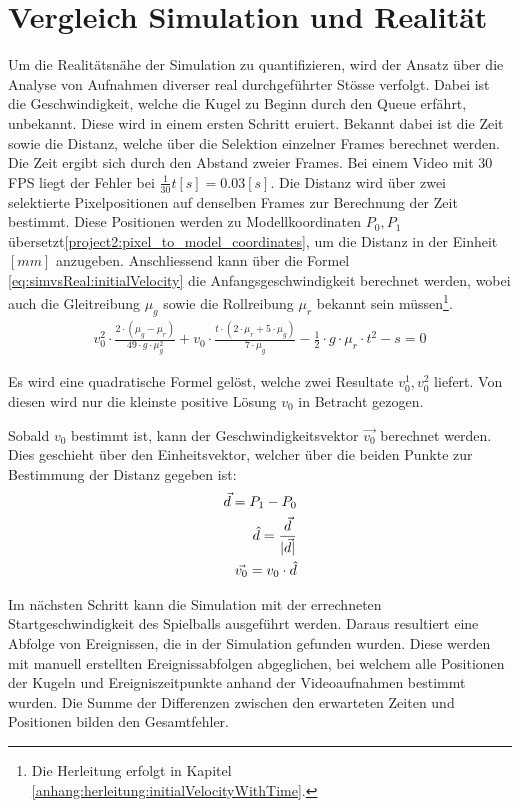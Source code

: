 \section{Vergleich Simulation und Realität}
Um die Realitätsnähe der Simulation zu quantifizieren, wird der Ansatz über die Analyse von Aufnahmen diverser real
durchgeführter Stösse verfolgt. Dabei ist die Geschwindigkeit, welche die Kugel zu Beginn durch den Queue erfährt,
unbekannt. Diese wird in einem ersten Schritt eruiert. Bekannt dabei ist die Zeit sowie die Distanz, welche über die
Selektion einzelner Frames berechnet werden. Die Zeit ergibt sich durch den Abstand zweier Frames. Bei einem Video mit
30 FPS liegt der Fehler bei $\frac{1}{30} t [s] = 0.03 [s]$. Die Distanz wird über zwei selektierte Pixelpositionen
auf denselben Frames zur Berechnung der Zeit bestimmt. Diese Positionen werden zu Modellkoordinaten $P_0, P_1$
übersetzt\ref{project2:pixel_to_model_coordinates}, um die
Distanz in der Einheit $[mm]$ anzugeben. Anschliessend kann über die Formel \ref{eq:simvsReal:initialVelocity} die Anfangsgeschwindigkeit berechnet
werden, wobei auch die Gleitreibung $\mu_g$ sowie die Rollreibung $\mu_r$ bekannt sein müssen\footnote{Die Herleitung
erfolgt in Kapitel \ref{anhang:herleitung:initialVelocityWithTime}.}.
\begin{align}
    v_0^2 \cdot \frac{2 \cdot (\mu_g - \mu_r)}{49 \cdot g \cdot \mu_g^2} + v_0 \cdot \frac{t \cdot (2 \cdot \mu_r + 5 \cdot \mu_g)}{7 \cdot \mu_g} - \frac{1}{2} \cdot g \cdot \mu_r \cdot t^2 - s = 0\label{eq:simvsReal:initialVelocity}
\end{align}

Es wird eine quadratische Formel gelöst, welche zwei Resultate $v^1_0, v^2_0$ liefert. Von diesen wird nur die
kleinste positive Lösung $v_0$ in Betracht gezogen.

Sobald $v_0$ bestimmt ist, kann der Geschwindigkeitsvektor $\vec{v_0}$ berechnet werden. Dies geschieht über den Einheitsvektor,
welcher über die beiden Punkte zur Bestimmung der Distanz gegeben ist:
\begin{align}
    \vec{d} = P_1 - P_0\\
    \hat{d} = \frac{\vec{d}}{\lvert \vec{d} \rvert}\\
    \vec{v_0} = v_0 \cdot \hat{d}
\end{align}

Im nächsten Schritt kann die Simulation mit der errechneten Startgeschwindigkeit des Spielballs ausgeführt werden.
Daraus resultiert eine Abfolge von Ereignissen, die in der Simulation gefunden wurden.
Diese werden mit manuell erstellten Ereignissabfolgen abgeglichen, bei welchem alle Positionen der Kugeln und Ereigniszeitpunkte
anhand der Videoaufnahmen bestimmt wurden. Die Summe der Differenzen zwischen den erwarteten Zeiten und Positionen bilden den Gesamtfehler.

